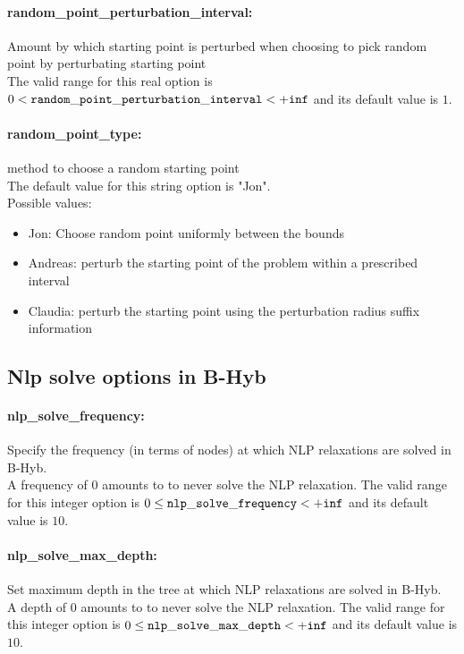 \paragraph{random\_point\_perturbation\_interval:}\label{sec:random_point_perturbation_interval} Amount by which starting point is perturbed when choosing to pick random point by perturbating starting point $\;$ \\
 The valid range for this real option is 
$0 <  {\tt random\_point\_perturbation\_interval } <  {\tt +inf}$
and its default value is $1$.


\paragraph{random\_point\_type:}\label{sec:random_point_type} method to choose a random starting point $\;$ \\

The default value for this string option is "Jon".
\\ 
Possible values:
\begin{itemize}
   \item Jon: Choose random point uniformly between the bounds
   \item Andreas: perturb the starting point of the problem
within a prescribed interval
   \item Claudia: perturb the starting point using the
perturbation radius suffix information
\end{itemize}

\subsection{Nlp solve options in B-Hyb}
\label{sec:Nlp_solve_options_in_B-Hyb}
\paragraph{nlp\_solve\_frequency:}\label{sec:nlp_solve_frequency} Specify the frequency (in terms of nodes) at which NLP relaxations are solved in B-Hyb. $\;$ \\
 A frequency of 0 amounts to to never solve the
NLP relaxation. The valid range for this integer option is
$0 \le {\tt nlp\_solve\_frequency } <  {\tt +inf}$
and its default value is $10$.


\paragraph{nlp\_solve\_max\_depth:}\label{sec:nlp_solve_max_depth} Set maximum depth in the tree at which NLP relaxations are solved in B-Hyb. $\;$ \\
 A depth of 0 amounts to to never solve the NLP
relaxation. The valid range for this integer option is
$0 \le {\tt nlp\_solve\_max\_depth } <  {\tt +inf}$
and its default value is $10$.



